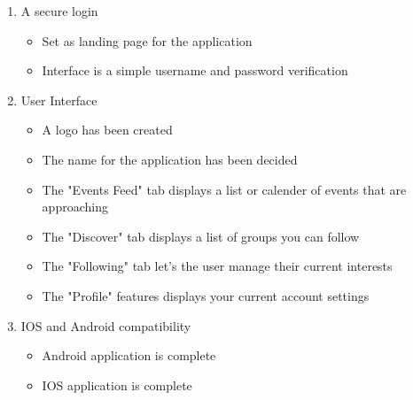 \documentclass[10pt,letterpaper]{article}
\begin{document}
\begin{enumerate}
   \item A secure login
     \begin{itemize}
     	\item Set as landing page for the application
        \item Interface is a simple username and password verification
     \end{itemize}
   \item User Interface
     \begin{itemize}
        \item A logo has been created
        \item The name for the application has been decided
        \item The "Events Feed" tab displays a list or calender of events that are approaching
        \item The "Discover" tab displays a list of groups you can follow
        \item The "Following" tab let's the user manage their current interests
        \item The "Profile" features displays your current account settings
	\end{itemize}
   \item IOS and Android compatibility 
   	\begin{itemize}
    	\item Android application is complete
    	\item IOS application is complete
    \end{itemize}

\end{enumerate}
\end{document}

